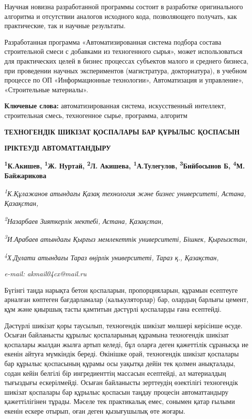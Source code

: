 {Научная новизна разработанной программы состоит в разработке
оригинального алгоритма и отсутствии аналогов исходного кода,
позволяющего получать, как практические, так и научные результаты.

Разработанная программа «Автоматизированная система подбора состава
строительной смеси с добавками из техногенного сырья», может
использоваться для практических целей в бизнес процессах субъектов
малого и среднего бизнеса, при проведении научных экспериментов
(магистратура, докторнатура), в учебном процессе по ОП «Информационные
технологии», Автоматизация и управление», «Строительные материалы».

{\bfseries Ключевые слова:} автоматизированная система, искусственный
интеллект, строительная смесь, техногенное сырье, программа, алгоритм

{\bfseries ТЕХНОГЕНДІК ШИКІЗАТ ҚОСПАЛАРЫ БАР ҚҰРЫЛЫС ҚОСПАСЫН}

{\bfseries ІРІКТЕУДІ АВТОМАТТАНДЫРУ}

{\bfseries \textsuperscript{1}К.Акишев\textsuperscript{\envelope },
\textsuperscript{1}Ж. Нуртай, \textsuperscript{2}Л. Акишева,
\textsuperscript{1}А.Тулегулов, \textsuperscript{3}Бийбосынов Б,
\textsuperscript{4}М. Байжарикова}

\emph{\textsuperscript{1}К.Құлажанов атындағы Қазақ технология және
бизнес университеті, Астана, Қазақстан,}

\emph{\textsuperscript{2}Назарбаев Зияткерлік мектебі, Астана,
Қазақстан,}

\emph{\textsuperscript{3}И.Арабаев атындағы Қырғыз мемлекеттік
университеті, Бішкек, Қырғызстан,}

\emph{\textsuperscript{4}Х.Дулати атындағы Тараз өңірлік университеті,
Тараз қ., Қазақстан,}

\emph{e-mail: akmail04cx@mail.ru}

Бүгінгі таңда нарықта бетон қоспаларын, пропорцияларын, құрамын
есептеуге арналған көптеген бағдарламалар (калькуляторлар) бар, олардың
барлығы цемент, құм және қиыршық тасты қамтитын дәстүрлі қоспаларды ғана
есептейді.

Дәстүрлі шикізат қоры таусылып, техногендік шикізат мөлшері керісінше
өсуде. Осыған байланысты құрылыс қоспаларының құрамына техногендік
шикізат қоспалары жылдан жылға артып келеді, бұл оларға деген қажеттілік
сұранысқа ие екенін айтуға мүмкіндік береді. Өкінішке орай, техногендік
шикізат қоспалары бар құрылыс қоспасының құрамы осы уақытқа дейін тек
қолмен анықталады, содан кейін белгілі бір ингредиенттің массасын
есептейді, ал материалдың тығыздығы ескерілмейді. Осыған байланысты
зерттеудің өзектілігі техногендік шикізат қоспалары бар құрылыс қоспасын
таңдау процесін автоматтандыру қажеттілігінен тұрады. Мәселе тек
практикалық емес, сонымен қатар ғылыми екенін ескере отырып, оған деген
қызығушылық өте жоғары.

}

